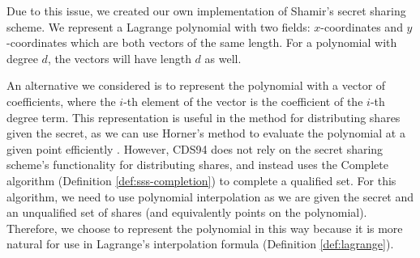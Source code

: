 Due to this issue, we created our own implementation of Shamir's secret sharing scheme. 
We represent a Lagrange polynomial with two fields: 
$x$-coordinates and $y$-coordinates which are both vectors of the same length. 
For a polynomial with degree $d$, the vectors will have length $d$ as well. 

An alternative we considered is to represent the polynomial with a vector of coefficients, 
where the $i$-th element of the vector is the coefficient of the $i$-th degree term. This representation 
is useful in the method for distributing shares given the secret, as we can use Horner's method 
to evaluate the polynomial at a given point efficiently \cite{horner}. However, CDS94 does not 
rely on the secret sharing scheme's functionality for distributing shares, and instead uses
the \textsf{Complete} algorithm (Definition \ref{def:sss-completion}) to complete a qualified set.
For this algorithm, we need to use polynomial interpolation as we are given the secret and an unqualified
set of shares (and equivalently points on the polynomial). 
Therefore, we choose to represent the polynomial in this way because it is more natural for use in 
Lagrange's interpolation formula (Definition \ref{def:lagrange}). 